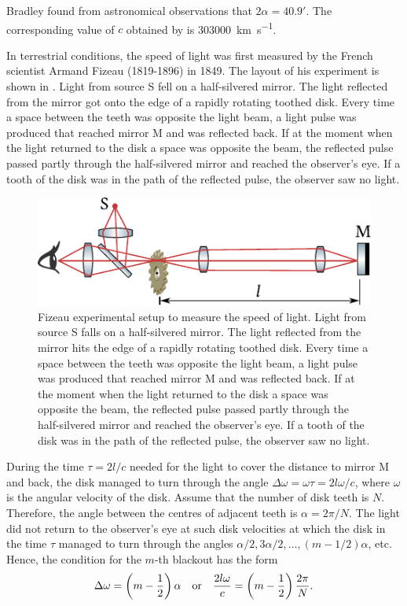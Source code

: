 Bradley found from astronomical observations that $2\alpha=\ang{;40.9;}$.
The corresponding value of $c$ obtained by  is \SI{303000}{km.s^{-1}}.

In terrestrial conditions, the speed of light was first measured by the French scientist Armand Fizeau (1819-1896) in 1849.
The layout of his experiment is shown in .
Light from source S fell on a half-silvered mirror.
The light reflected from the mirror got onto the edge of a rapidly rotating toothed disk.
Every time a space between the teeth was opposite the light beam, a light pulse was produced that reached mirror M and was reflected back.
If at the moment when the light returned to the disk a space was opposite the beam, the reflected pulse passed partly through the half-silvered mirror and reached the observer's eye.
If a tooth of the disk was in the path of the reflected pulse, the observer saw no light.

\begin{figure}[t]
	\begin{center}
		\includegraphics[scale=1]{figures/ch_21/fig_21_2.pdf}
        \caption[]{Fizeau experimental setup to measure the speed of light. Light from source S falls on a half-silvered mirror.
		The light reflected from the mirror hits the edge of a rapidly rotating toothed disk. Every time a space between the teeth was opposite the light beam, a light pulse was produced that reached mirror M and was reflected back. If at the moment when the light returned to the disk a space was opposite the beam, the reflected pulse passed partly through the half-silvered mirror and reached the observer's eye.
		If a tooth of the disk was in the path of the reflected pulse, the observer saw no light.}
		\label{fig:21_2}
	\end{center}
	\vspace{-0.8cm}
\end{figure}

During the time $\tau=2l/c$ needed for the light to cover the distance to mirror M and back, the disk managed to turn through the angle $\Delta{\omega}=\omega\tau=2l\omega/c$, where $\omega$ is the angular velocity of the disk.
Assume that the number of disk teeth is $N$.
Therefore, the angle between the centres of adjacent teeth is $\alpha = 2\pi/N$.
The light did not return to the observer's eye at such disk velocities at which the disk in the time $\tau$ managed to turn through the angles $\alpha/2, 3\alpha/2, \ldots, (m-1/2)\alpha$, etc.
Hence, the condition for the $m$-th blackout has the form
\begin{equation*}
	\Delta{\omega} = \left(m - \frac{1}{2}\right) \alpha \quad \text{or} \quad \frac{2l\omega}{c} = \left(m - \frac{1}{2}\right) \frac{2\pi}{N}.
\end{equation*}

